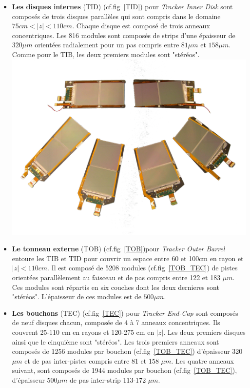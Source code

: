 \begin{itemize}[label=$\bullet$]
\item \textbf{Les disques internes} (TID) (cf.fig~\ref{TID}) pour \textit{Tracker Inner Disk} sont composés de trois disques parallèles qui sont compris dans le domaine $75cm<|z|<110cm$. Chaque disque est composé de trois anneaux concentriques. Les 816 modules sont composés de strips d'une épaisseur de $320\mu m$ orientées radialement pour un pas compris entre $81\mu m$ et $158\mu m$. Comme pour le TIB, les deux premiers modules sont "stéréos".
\marginpar
{
	\centering
	\includegraphics[width=\marginparwidth]{CMS/TOB_TEC.png}
	\label{TOB_TEC}
}
\item \textbf{Le tonneau externe } (TOB) (cf.fig~\ref{TOB})pour \textit{Tracker Outer Barrel} entoure les TIB et TID pour couvrir un espace entre 60 et 100cm en rayon et $|z|<110cm$. Il est composé de 5208 modules (cf.fig~\ref{TOB_TEC}) de pistes orientées parallèlement au faisceau et de pas compris entre 122 et 183 $\mu m$. Ces modules sont répartis en six couches dont les deux dernieres sont "stéréos". L'épaisseur de ces modules est de $500\mu m$.   

\item \textbf{Les bouchons }(TEC) (cf.fig~\ref{TEC}) pour \textit{Tracker End-Cap} sont composés de neuf disques chacun, composée de 4 à 7 anneaux concentriques. Ils couvrent 25-110 cm en rayons et 120-275 cm en $|z|$. Les deux premiers disques ainsi que le cinquième sont "stéréos". Les trois premiers anneaux sont composés de 1256 modules par bouchon (cf.fig~\ref{TOB_TEC}) d'épaisseur 320$\mu m$ et de pas inter-pistes compris entre 81 et 158 $\mu m$. Les quatre anneaux suivant, sont composés de 1944 modules par bouchon (cf.fig~\ref{TOB_TEC}), d'épaisseur $500\mu m$ de pas inter-strip 113-172 $\mu m$.
\end{itemize}

